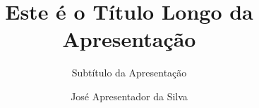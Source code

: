 \documentclass{Jampa}
\title[Título Curto]{Este é o Título Longo da Apresentação}
\subtitle[Subtítulo Curto]{Subtítulo da Apresentação}
\author[José]{José Apresentador da Silva}
\begin{document}
  \insertcoverframe

  

  \inserttocframe

	

  

  
\end{document}
